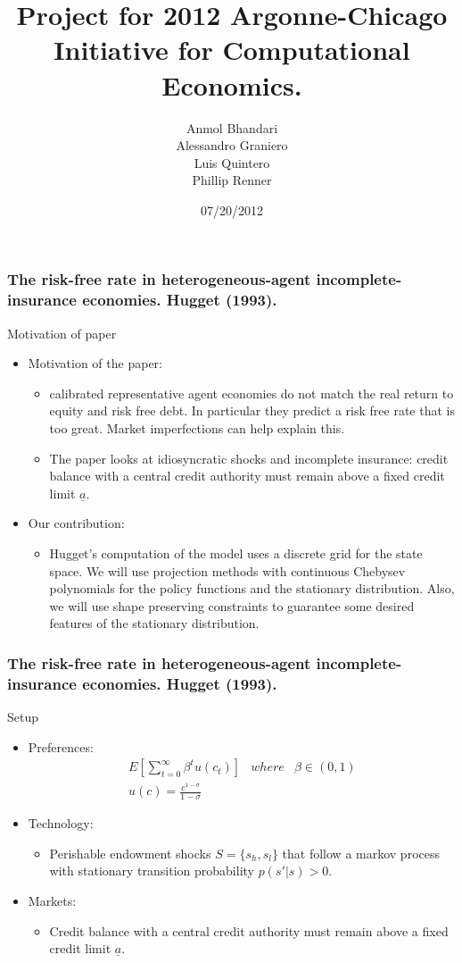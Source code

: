\documentclass{beamer}
\title{Project for 2012 Argonne-Chicago Initiative for Computational Economics.}
\author{Anmol Bhandari\\
	     Alessandro Graniero \\
		Luis Quintero \\
		Phillip Renner
}
\date{07/20/2012}
\begin{document}
\frame{\titlepage}


\frame
{
  \frametitle{ The risk-free rate in heterogeneous-agent incomplete-insurance economies. Hugget (1993).}
Motivation of paper
\begin{itemize}
	\item Motivation of the paper:
	\begin{itemize}
		\item  calibrated representative agent economies do not match the real return to equity and 
		risk free debt. In particular they predict a risk free rate that is too great. Market imperfections can help explain this. 
		\item The paper looks at idiosyncratic shocks and incomplete insurance: credit balance with a central credit authority 
		must remain above a  fixed credit limit $\underline{a}$.
	\end{itemize}
	\item Our  contribution: 
	\begin{itemize}
		\item Hugget's computation of the model uses a discrete grid for the state space. We will use projection methods with 
		continuous Chebysev polynomials for the policy functions and the stationary distribution. Also, we will use shape 
		preserving constraints to guarantee some desired features of the stationary distribution.
	\end{itemize}
\end{itemize}
}

\frame
{
  \frametitle{  The risk-free rate in heterogeneous-agent incomplete-insurance economies. Hugget (1993).}
  Setup 
\begin{itemize}
	\item Preferences: 
		\begin{eqnarray*}
		E \left [ \sum_{t=0}^\infty \beta^t u(c_t) \right ] & where & \beta \in (0,1)\\
		u(c) = \frac{c^{1-\sigma}}{1-\sigma}
	\end{eqnarray*}
	\item Technology:
	\begin{itemize}
			\item Perishable endowment shocks $S=\{s_h,s_l\}$ that follow a markov process with 
			stationary transition probability $p(s' \vert s) >0$.
	\end{itemize}
	\item Markets:
	\begin{itemize}
		\item  Credit balance with a central credit authority must remain above a  fixed credit limit $\underline{a}$.
	\end{itemize}

\end{itemize}
}
\end{document}
